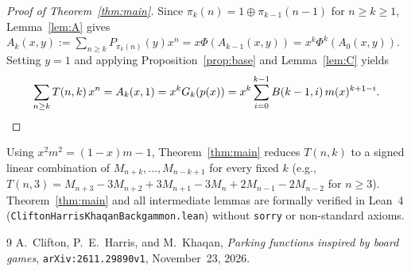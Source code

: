 \documentclass[11pt]{article}
\begin{document}
\begin{proof}[Proof of Theorem~\ref{thm:main}]
Since $\pi_k(n) = 1 \oplus \pi_{k-1}(n - 1)$ for $n \ge k \ge 1$, Lemma~\ref{lem:A} gives $A_k(x, y) := \sum_{n \ge k} P_{\pi_k(n)}(y) x^n = x \Phi(A_{k-1}(x, y)) = x^k \Phi^k(A_0(x, y))$. Setting $y = 1$ and applying Proposition~\ref{prop:base} and Lemma~\ref{lem:C} yields
\[
  \sum_{n \ge k} T(n, k)\, x^n = A_k(x, 1) = x^k G_k(p(x)) = x^k \sum_{i=0}^{k-1} B(k - 1, i)\, m(x)^{k + 1 - i}. \qedhere
\]
\end{proof}

Using $x^2 m^2 = (1 - x)m - 1$, Theorem~\ref{thm:main} reduces $T(n, k)$ to a signed linear combination of $M_{n + k}, \dots, M_{n - k + 1}$ for every fixed $k$ (e.g., $T(n, 3) = M_{n+3} - 3M_{n+2} + 3M_{n+1} - 3M_n + 2M_{n-1} - 2M_{n-2}$ for $n \ge 3$). Theorem~\ref{thm:main} and all intermediate lemmas are formally verified in Lean~4 (\texttt{CliftonHarrisKhaqanBackgammon.lean}) without \texttt{sorry} or non-standard axioms.

\begin{thebibliography}{9}
A.~Clifton, P.~E.~Harris, and M.~Khaqan,
\emph{Parking functions inspired by board games},
\texttt{arXiv:2611.29890v1}, November~23, 2026.
\end{thebibliography}
\end{document}
